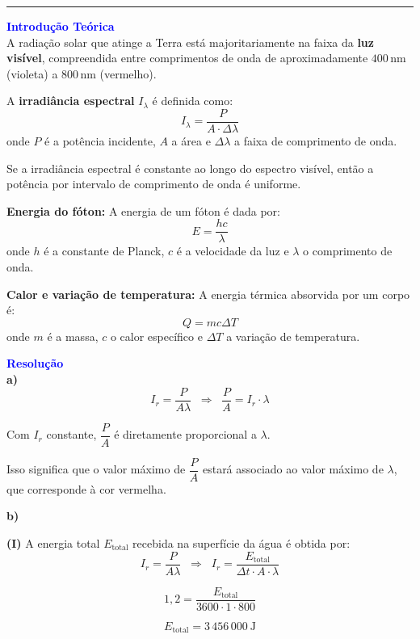 \documentclass[a4paper,12pt]{article}
\begin{document}
\noindent\rule{\textwidth}{1pt}

\textbf{\textcolor{blue}{\Large Introdução Teórica}}\\

A radiação solar que atinge a Terra está majoritariamente na faixa da \textbf{luz visível}, compreendida entre comprimentos de onda de aproximadamente $400\,\text{nm}$ (violeta) a $800\,\text{nm}$ (vermelho).

A \textbf{irradiância espectral} $I_\lambda$ é definida como:
\[
I_\lambda = \frac{P}{A \cdot \Delta \lambda}
\]
onde $P$ é a potência incidente, $A$ a área e $\Delta \lambda$ a faixa de comprimento de onda.

Se a irradiância espectral é constante ao longo do espectro visível, então a potência por intervalo de comprimento de onda é uniforme.

\textbf{Energia do fóton:}
A energia de um fóton é dada por:
\[
E = \frac{hc}{\lambda}
\]
onde $h$ é a constante de Planck, $c$ é a velocidade da luz e $\lambda$ o comprimento de onda.

\textbf{Calor e variação de temperatura:}
A energia térmica absorvida por um corpo é:
\[
Q = m c \Delta T
\]
onde $m$ é a massa, $c$ o calor específico e $\Delta T$ a variação de temperatura.

\vspace{0.5cm}

\textbf{\textcolor{blue}{\Large Resolução}}\\

\textbf{a)} 
\[
I_r = \frac{P}{A \lambda} \;\;\Rightarrow\;\; \frac{P}{A} = I_r \cdot \lambda
\]

Com $I_r$ constante, $\dfrac{P}{A}$ é diretamente proporcional a $\lambda$. 

Isso significa que o valor máximo de $\dfrac{P}{A}$ estará associado ao valor máximo de $\lambda$, que corresponde à cor vermelha.

\vspace{0.4cm}

\textbf{b)} 

\textbf{(I)} A energia total $E_{\text{total}}$ recebida na superfície da água é obtida por:
\[
I_r = \frac{P}{A \lambda} \;\;\Rightarrow\;\; I_r = \frac{E_{\text{total}}}{\Delta t \cdot A \cdot \lambda}
\]

\[
1{,}2 = \frac{E_{\text{total}}}{3600 \cdot 1 \cdot 800}
\]

\[
\boxed{E_{\text{total}} = 3\,456\,000\ \text{J}}
\]

\vspace{0.3cm}
\end{document}

